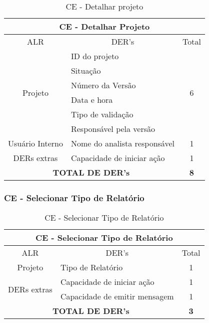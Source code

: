       \begin{table}[!h]
      \centering
      \caption{CE - Detalhar projeto}
      \label{ce_detalhar_projeto}
      \begin{tabular}{|c|l|c|}
      \hline
      \multicolumn{3}{|c|}{CE - Detalhar Projeto}                                  \\ \hline
      ALR                      & \multicolumn{1}{c|}{DER's}   & Total              \\ \hline
      \multirow{6}{*}{Projeto} & ID do projeto                & \multirow{6}{*}{6} \\ \cline{2-2}
			      & Situação                     &                    \\ \cline{2-2}
			      & Número da Versão             &                    \\ \cline{2-2}
			      & Data e hora                  &                    \\ \cline{2-2}
			      & Tipo de validação            &                    \\ \cline{2-2}
			      & Responsável pela versão      &                    \\ \hline
      Usuário Interno                 & Nome do analista responsável & 1                  \\ \hline
      DERs extras              & Capacidade de iniciar ação   & 1                  \\ \hline
      \multicolumn{2}{|c|}{\textbf{TOTAL DE DER's}}           & \textbf{8}         \\ \hline
      \end{tabular}
      \end{table}
      

      
	
   \subsubsection{CE - Selecionar Tipo de Relatório}
      

      \begin{table}[!h]
      \centering
      \caption{CE - Selecionar Tipo de Relatório}
      \label{ce_tipo_relatorio}
      \begin{tabular}{|c|l|c|}
      \hline
      \multicolumn{3}{|c|}{CE - Selecionar Tipo de Relatório}                              \\ \hline
      ALR                          & \multicolumn{1}{c|}{DER's}    & Total        \\ \hline
      Projeto                      & Tipo de Relatório             & 1            \\ \hline
      \multirow{2}{*}{DERs extras} & Capacidade de iniciar ação    & 1            \\ \cline{2-3} 
				  & Capacidade de emitir mensagem & 1            \\ \hline
       \multicolumn{2}{|c|}{\textbf{TOTAL DE DER's}}          & \textbf{3}         \\ \hline
      \end{tabular}
      \end{table}

      
      